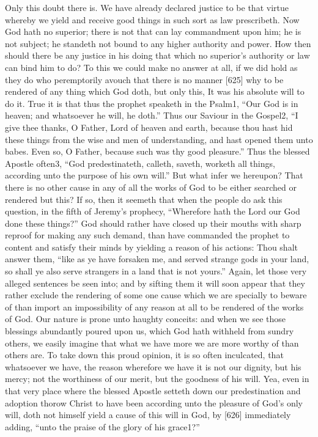 Only this doubt there is. We have already declared justice to be that virtue whereby we yield and receive good things in such sort as law prescribeth. Now God hath no superior; there is not that can lay commandment upon him; he is not subject; he standeth not bound to any higher authority and power. How then should there be any justice in his doing that which no superior’s authority or law can bind him to do? To this we could make no answer at all, if we did hold as they do who peremptorily avouch that there is no manner [625] why to be rendered of any thing which God doth, but only this, It was his absolute will to do it. True it is that thus the prophet speaketh in the Psalm1, “Our God is in heaven; and whatsoever he will, he doth.” Thus our Saviour in the Gospel2, “I give thee thanks, O Father, Lord of heaven and earth, because thou hast hid these things from the wise and men of understanding, and hast opened them unto babes. Even so, O Father, because such was thy good pleasure.” Thus the blessed Apostle often3, “God predestinateth, calleth, saveth, worketh all things, according unto the purpose of his own will.” But what infer we hereupon? That there is no other cause in any of all the works of God to be either searched or rendered but this? If so, then it seemeth that when the people do ask this question, in the fifth of Jeremy’s prophecy, “Wherefore hath the Lord our God done these things?” God should rather have closed up their mouths with sharp reproof for making any such demand, than have commanded the prophet to content and satisfy their minds by yielding a reason of his actions: Thou shalt answer them, “like as ye have forsaken me, and served strange gods in your land, so shall ye also serve strangers in a land that is not yours.” Again, let those very alleged sentences be seen into; and by sifting them it will soon appear that they rather exclude the rendering of some one cause which we are specially to beware of than import an impossibility of any reason at all to be rendered of the works of God. Our nature is prone unto haughty conceits: and when we see those blessings abundantly poured upon us, which God hath withheld from sundry others, we easily imagine that what we have more we are more worthy of than others are. To take down this proud opinion, it is so often inculcated, that whatsoever we have, the reason wherefore we have it is not our dignity, but his mercy; not the worthiness of our merit, but the goodness of his will. Yea, even in that very place where the blessed Apostle setteth down our predestination and adoption thorow Christ to have been according unto the pleasure of God’s only will, doth not himself yield a cause of this will in God, by [626] immediately adding, “unto the praise of the glory of his grace1?”

